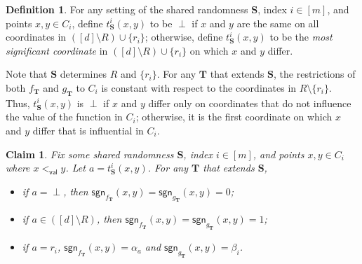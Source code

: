 \documentclass[11pt]{article}
\numberwithin{equation}{section}
\newtheorem{claim}[theorem]{Claim}
\theoremstyle{definition}
\newtheorem{definition}[theorem]{Definition}
\theoremstyle{plain}
\newcommand{\bS}{\ensuremath{\mathbf{S}}}
\newcommand{\bT}{\ensuremath{\mathbf{T}}}
\newcommand{\order}{\ensuremath{<_\dec}}
\newcommand{\coord}[2]{t^{#1}_{#2}}
\newcommand{\dec}{\mathsf{val}}
\newcommand{\sgn}{\mathsf{sgn}}
\begin{document}
\begin{definition} \label{def:t}
For any setting of the shared randomness $\bS$,
index %
$i \in [m]$, and points $x,y \in C_i$, define $\coord{i}{\bS}(x,y)$
to be $\perp$ if $x$ and $y$ are the same on all coordinates in $([d] \setminus R) \cup \{r_i\}$; otherwise, define $\coord{i}{\bS}(x,y)$ to be the \emph{most significant coordinate}
in $([d] \setminus R) \cup \{r_i\}$ on which $x$ and $y$ differ.
\end{definition}

Note that $\bS$ determines $R$ and $\{r_i\}$.
For any $\bT$ that extends $\bS$, the restrictions of both $f_{\bT}$ and $g_{\bT}$ to $C_i$ is constant with respect to the coordinates in $R \setminus \{r_i\}$.
Thus, $\coord{i}{\bS}(x,y)$ is $\perp$ if $x$ and $y$ differ only on coordinates that do not influence the value of the function in $C_i$; otherwise, it is the first coordinate on which $x$ and $y$ differ that is influential
in $C_i$.

\begin{claim}\label{clm:interesting}
Fix some shared randomness $\bS$, 
index %
$i \in [m]$, and points $x,y \in C_i$ where $x \order y$.
Let $a = \coord{i}{\bS}(x,y)$.
For any $\bT$ that extends $\bS$,
\begin{itemize}
    \item if $a = \perp$, then $\sgn_{f_{\bT}}(x,y) = \sgn_{g_{\bT}}(x,y) = 0$;
    \item if $a \in ([d] \setminus R)$, then $\sgn_{f_{\bT}}(x,y) = \sgn_{g_{\bT}}(x,y) = 1$;
    \item if $a = r_i$, $\sgn_{f_{\bT}}(x,y) = \alpha_{a}$ and $\sgn_{g_{\bT}}(x,y) = \beta_i$.
\end{itemize}
\end{claim}
\end{document}
